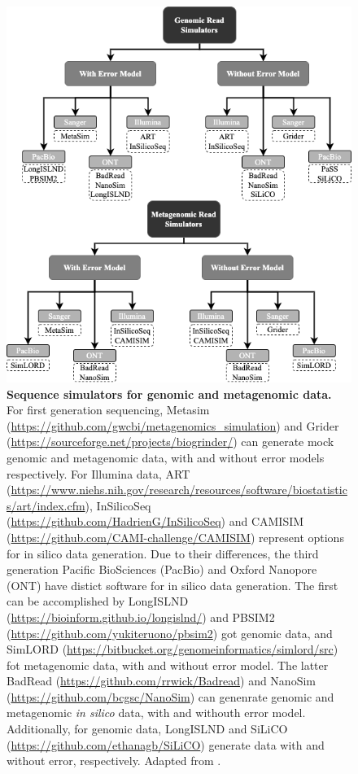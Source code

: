 \begin{figure}[h!]
\centering
\includegraphics[width=\textwidth]{figures/introduction/Figure 5.png}
\caption{\textbf{Sequence simulators for genomic and metagenomic data.} For first generation sequencing, Metasim (\url{https://github.com/gwcbi/metagenomics_simulation}) and Grider (\url{https://sourceforge.net/projects/biogrinder/}) can generate mock genomic and metagenomic data, with and without error models respectively. For Illumina data, ART (\url{https://www.niehs.nih.gov/research/resources/software/biostatistics/art/index.cfm}), InSilicoSeq (\url{https://github.com/HadrienG/InSilicoSeq}) and CAMISIM (\url{https://github.com/CAMI-challenge/CAMISIM}) represent options for in silico data generation. Due to their differences, the third generation Pacific BioSciences (PacBio) and Oxford Nanopore (ONT) have distict software for in silico data generation. The first can be accomplished by LongISLND (\url{https://bioinform.github.io/longislnd/}) and PBSIM2 (\url{https://github.com/yukiteruono/pbsim2}) got genomic data, and SimLORD (\url{https://bitbucket.org/genomeinformatics/simlord/src}) fot metagenomic data, with and without error model. The latter BadRead (\url{https://github.com/rrwick/Badread}) and NanoSim (\url{https://github.com/bcgsc/NanoSim}) can genenrate genomic and metagenomic \textit{in silico} data, with and withouth error model. Additionally, for genomic data, LongISLND and SiLiCO (\url{https://github.com/ethanagb/SiLiCO}) generate data with and without error, respectively. Adapted from \cite{escalona_comparison_2016}.}
\label{fig:figure5}
\end{figure}


